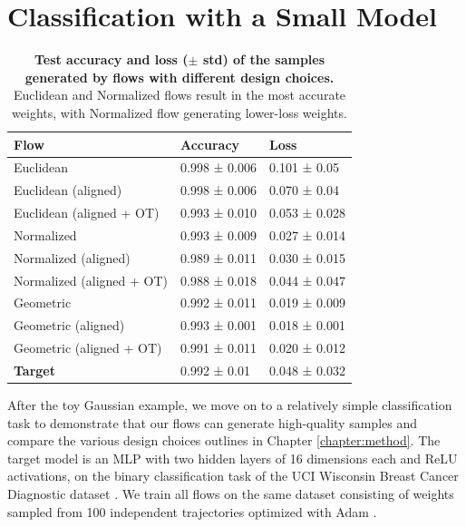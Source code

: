 \section{Classification with a Small Model}


\begin{table}[t!]
    \centering
    \begin{tabular}{lll}
        \toprule
        \textbf{Flow}  & \textbf{Accuracy} & \textbf{Loss} \\
        \midrule
        Euclidean                   & 0.998 ± 0.006     & 0.101 ± 0.05 \\ 
        Euclidean (aligned)         & 0.998 ± 0.006     & 0.070 ± 0.04 \\
        Euclidean (aligned + OT)    & 0.993 ± 0.010     & 0.053 ± 0.028 \\
        \midrule
        Normalized                  & 0.993 ± 0.009     & 0.027 ± 0.014 \\
        Normalized (aligned)        & 0.989 ± 0.011     & 0.030 ± 0.015 \\
        Normalized (aligned + OT)   & 0.988 ± 0.018	    & 0.044 ± 0.047 \\
        \midrule
        Geometric                   & 0.992 ± 0.011     & 0.019 ± 0.009 \\
        Geometric (aligned)         & 0.993 ± 0.001     & 0.018 ± 0.001 \\
        Geometric (aligned + OT)    & 0.991 ± 0.011 	& 0.020 ± 0.012 \\
        \midrule
        \textbf{Target}             & 0.992 ± 0.01      & 0.048 ± 0.032 \\
        \bottomrule
    \end{tabular}
    \caption{\label{tab:uci_class_table}\textbf{Test accuracy and loss ($\pm$ std) of the samples generated by flows with different design choices.} Euclidean and Normalized flows result in the most accurate weights, with Normalized flow generating lower-loss weights.}
\end{table}

After the toy Gaussian example, we move on to a relatively simple classification task to demonstrate that our flows can generate high-quality samples and compare the various design choices outlines in Chapter \ref{chapter:method}. The target model is an MLP with two hidden layers of 16 dimensions each and ReLU activations, on the binary classification task of the UCI Wisconsin Breast Cancer Diagnostic dataset \citep{streetNuclearFeatureExtraction1993}. We train all flows on the same dataset consisting of weights sampled from 100 independent trajectories optimized with Adam \citep{kingmaAdamMethodStochastic2017}. 

